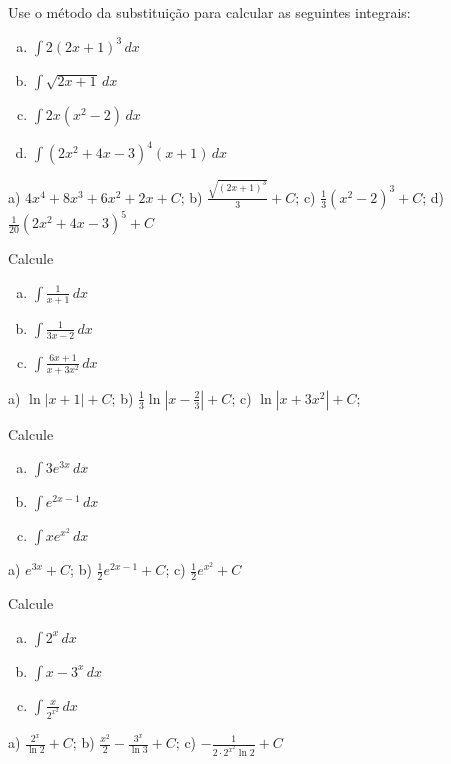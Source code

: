 \begin{exer}
  Use o método da substituição para calcular as seguintes integrais:
  \begin{enumerate}[a)]
  \item $\displaystyle \int 2(2x+1)^3\,dx$
  \item $\displaystyle \int \sqrt{2x+1}\,dx$
  \item $\displaystyle \int 2x(x^2-2)\,dx$
  \item $\displaystyle \int (2x^2+ 4x - 3)^4(x+1)\,dx$
  \end{enumerate}
\end{exer}
\begin{resp}
  a) $\displaystyle 4x^4+8x^3+6x^2+2x+C$; b) $\displaystyle \frac{\sqrt{(2x+1)^3}}{3} + C$; c) $\displaystyle \frac{1}{3}(x^2-2)^3 + C$; d) $\frac{1}{20}(2x^2 + 4x - 3)^5 + C$
\end{resp}

\begin{exer}
  Calcule
  \begin{enumerate}[a)]
  \item $\displaystyle \int \frac{1}{x+1}\,dx$
  \item $\displaystyle \int \frac{1}{3x-2}\,dx$
  \item $\displaystyle \int \frac{6x + 1}{x + 3x^2}\,dx$
  \end{enumerate}
\end{exer}
\begin{resp}
  a) $\displaystyle \ln |x+1| + C$; b) $\displaystyle \frac{1}{3}\ln \left|x-\frac{2}{3}\right| + C$; c) $\displaystyle \ln \left|x + 3x^2\right| + C$;
\end{resp}

\begin{exer}
  Calcule
  \begin{enumerate}[a)]
  \item $\displaystyle \int 3e^{3x}\,dx$
  \item $\displaystyle \int e^{2x-1}\,dx$
  \item $\displaystyle \int xe^{x^2}\,dx$
  \end{enumerate}
\end{exer}
\begin{resp}
  a) $\displaystyle e^{3x}+C$; b) $\displaystyle \frac{1}{2}e^{2x-1} + C$; c) $\displaystyle \frac{1}{2}e^{x^2} + C$
\end{resp}

\begin{exer}
  Calcule
  \begin{enumerate}[a)]
  \item $\displaystyle \int 2^x\,dx$
  \item $\displaystyle \int x - 3^x\,dx$
  \item $\displaystyle \int \frac{x}{2^{x^2}}\,dx$
  \end{enumerate}
\end{exer}
\begin{resp}
  a) $\displaystyle \frac{2^x}{\ln 2} + C$; b) $\frac{x^2}{2} - \frac{3^x}{\ln 3} + C$; c) $\displaystyle -\frac{1}{2\cdot 2^{x^2}\ln 2} + C$
\end{resp}

